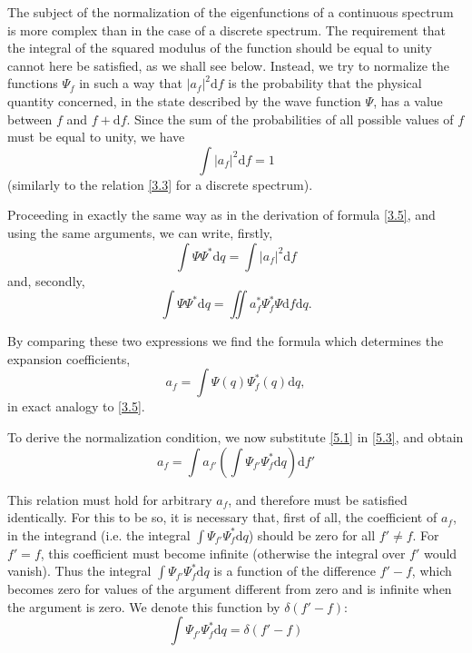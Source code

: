 The subject of the normalization of the eigenfunctions of a continuous spectrum is more complex than in the case of a discrete spectrum. The requirement that the integral of the squared modulus of the function should be equal to unity cannot here be satisfied, as we shall see below. Instead, we try to normalize the functions $ \Psi_f $ in such a way that $ |a_f|^2\mathrm{d}f $ is the probability that the physical quantity concerned, in the state described by the wave function $ \Psi $, has a value between $ f $ and $ f + \mathrm{d}f $. Since the sum of the probabilities of all possible values of $ f $ must be equal to unity, we have
\begin{equation}\label{5.2}
\int|a_f|^2\mathrm{d}f=1
\end{equation}
(similarly to the relation \eqref{3.3} for a discrete spectrum).
	
Proceeding in exactly the same way as in the derivation of formula \eqref{3.5}, and using the same arguments, we can write, firstly,
\[ \int\Psi\Psi^*\mathrm{d}q=\int|a_f|^2\mathrm{d}f \]
and, secondly,
\[ \int\Psi\Psi^*\mathrm{d}q=\iint a_f^*\Psi_f^*\Psi\mathrm{d}f\mathrm{d}q. \]	
	
By comparing these two expressions we find the formula which determines the expansion coefficients,
\begin{equation}\label{5.3}
a_f=\int\Psi(q)\Psi_f^*(q)\mathrm{d}q,
\end{equation}	
in exact analogy to \eqref{3.5}.
	
To derive the normalization condition, we now substitute \eqref{5.1} in \eqref{5.3}, and obtain
\[ a_f=\int a_{f'}\left(\int \Psi_{f'}\Psi_{f}^*\mathrm{d}q\right)\mathrm{d}f' \]	
	
This relation must hold for arbitrary $ a_f $, and therefore must be satisfied identically. For this to be so, it is necessary that, first of all, the coefficient of $ a_f $, in the integrand (i.e. the integral $ \int \Psi_{f'}\Psi_{f}^*\mathrm{d}q $) should be zero for all $ f′ \ne f $. For $ f′ = f $, this coefficient must become infinite (otherwise the integral over $ f′ $ would vanish). Thus the integral $ \int \Psi_{f'}\Psi_{f}^*\mathrm{d}q $ is a function of the difference $ f'-f $, which becomes zero for values of the argument different from zero and is infinite when the argument is zero. We denote this function by $ \delta(f'-f) $:
\begin{equation}\label{5.4}
\int \Psi_{f'}\Psi_{f}^*\mathrm{d}q=\delta(f'-f)
\end{equation}	

